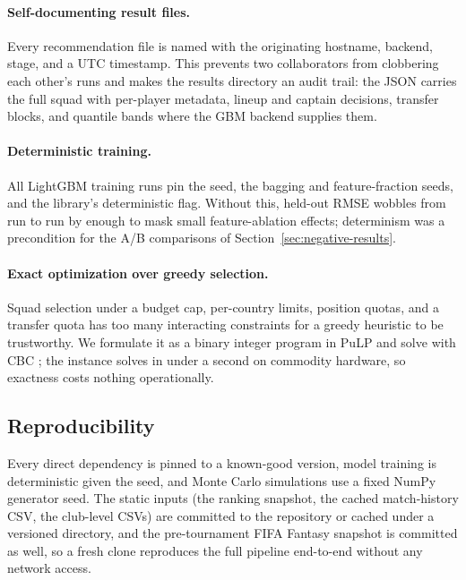 \paragraph{Self-documenting result files.}
Every recommendation file is named with the originating hostname,
backend, stage, and a UTC timestamp. This prevents two collaborators
from clobbering each other's runs and makes the results directory an
audit trail: the JSON carries the full squad with per-player
metadata, lineup and captain decisions, transfer blocks, and
quantile bands where the GBM backend supplies them.

\paragraph{Deterministic training.}
All LightGBM \citep{ke2017lightgbm} training runs pin the seed, the
bagging and feature-fraction seeds, and the library's deterministic
flag. Without this, held-out RMSE wobbles from run to run by enough
to mask small feature-ablation effects; determinism was a
precondition for the A/B comparisons of
Section~\ref{sec:negative-results}.

\paragraph{Exact optimization over greedy selection.}
Squad selection under a budget cap, per-country limits, position
quotas, and a transfer quota has too many interacting constraints
for a greedy heuristic to be trustworthy. We formulate it as a
binary integer program in PuLP \citep{pulp} and solve with CBC
\citep{cbc}; the instance solves in under a second on commodity
hardware, so exactness costs nothing operationally.

\subsection{Reproducibility}
\label{sec:implementation-reproducibility}

Every direct dependency is pinned to a known-good version, model
training is deterministic given the seed, and Monte Carlo
simulations use a fixed NumPy generator seed. The static inputs (the
ranking snapshot, the cached match-history CSV, the club-level CSVs)
are committed to the repository or cached under a versioned
directory, and the pre-tournament FIFA Fantasy snapshot is committed
as well, so a fresh clone reproduces the full pipeline end-to-end
without any network access.

